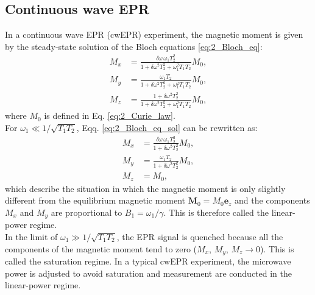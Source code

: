 \documentclass[a4paper]{book}
\newcommand{\mb}{\mathbf}
\newcommand{\mbe}{\mathbf{e}}
\begin{document}
	\subsection{Continuous wave EPR}
	\label{sec:2_cwEPR}
	In a  continuous wave EPR (cwEPR) experiment, the magnetic moment is given by the steady-state solution of the Bloch equations \eqref{eq:2_Bloch_eq}:
	\begin{subequations}
		\label{eq:2_Bloch_eq_sol}
		\begin{align}
			M_{x} & = \frac{\delta \omega \, \omega_1T_2^2}{1 + \delta\omega^2 T_2^2 + \omega_1^2T_1T_2}M_0,\\
			M_{y} & = \frac{\omega_1T_2}{1 + \delta\omega^2 T_2^2 + \omega_1^2T_1T_2}M_0,\\
			M_{z} & = \frac{1 + \delta \omega^2T_2^2}{1 + \delta\omega^2 T_2^2 + \omega_1^2T_1T_2}M_0,
		\end{align}
	\end{subequations}
	where $M_0$ is defined in Eq. \eqref{eq:2_Curie_law}.\\
	For $\omega_1 \ll 1/\sqrt{T_1T_2}$, Eqq. \eqref{eq:2_Bloch_eq_sol} can be rewritten as:
	\begin{subequations}
		\label{eq:2_Bloch_eq_sol_lin}
		\begin{align}
			M_{x} & = \frac{\delta \omega \, \omega_1T_2^2}{1 + \delta\omega^2 T_2^2}M_0,\\
			M_{y} & = \frac{\omega_1T_2}{1 + \delta\omega^2 T_2^2}M_0,\\
			M_{z} & = M_0,
		\end{align}
	\end{subequations}
	which describe the situation in which the magnetic moment is only slightly different from the equilibrium magnetic moment $\mb M_0 = M_0 \mbe_{z}$ and the components $M_x$ and $M_y$ are proportional to $B_1 = \omega_1/\gamma$. This is therefore called the linear-power regime.\\
	In the limit of $\omega_1 \gg 1/\sqrt{T_1T_2}$, the EPR signal is quenched because all the components of the magnetic moment tend to zero ($M_{x}$, $M_{y}$, $M_{z} \rightarrow 0$). This is called the saturation regime. In a typical cwEPR experiment, the microwave power is adjusted to avoid saturation and measurement are conducted in the linear-power regime.
	
\end{document}
